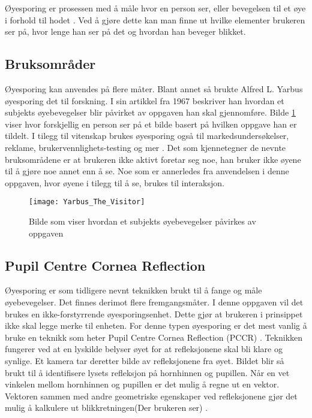 Øyesporing er prosessen med å måle hvor en person ser, eller bevegelsen til et øye i forhold til hodet \cite{Eye t4:online}. Ved å gjøre dette kan man finne ut hvilke elementer brukeren ser på, hvor lenge han ser på det og hvordan han beveger blikket. 


\subsection{Bruksområder}

Øyesporing kan anvendes på flere måter. Blant annet så brukte Alfred L. Yarbus øyesporing det til forskning. I sin artikkel fra 1967 \cite{wexle4:online} beskriver han hvordan et subjekts øyebevegelser blir påvirket av oppgaven han skal gjennomføre. Bilde \ref{fig:yarbus} viser hvor forskjellig en person ser på et bilde basert på hvilken oppgave han er tildelt. I tilegg til vitenskap brukes øyesporing også til markedsundersøkelser, reklame, brukervennlighets-testing og mer \cite{Case2:online}. Det som kjennetegner de nevnte bruksområdene er at brukeren ikke aktivt foretar seg noe, han bruker ikke øyene til å gjøre noe annet enn å se. Noe som er annerledes fra anvendelsen i denne oppgaven, hvor øyene i tilegg til å se, brukes til interaksjon.



\begin{figure}[ht!]
\centering
\texttt{[image: Yarbus\_The\_Visitor]}
\caption{Bilde som viser hvordan et subjekts øyebevegelser påvirkes av oppgaven \cite{Yarbu2:online}}
\label{fig:yarbus}
\end{figure}


\subsection{Pupil Centre Cornea Reflection}

Øyesporing er som tidligere nevnt teknikken brukt til å fange og måle øyebevegelser. Det finnes derimot flere fremgangsmåter. I denne oppgaven vil det brukes en ikke-forstyrrende øyesporingsenhet. Dette gjør at brukeren i prinsippet ikke skal legge merke til enheten. For denne typen øyesporing er det mest vanlig å bruke en teknikk som heter Pupil Centre Cornea Reflection (\gls{PCCR}) \cite{Calibration}. Teknikken fungerer ved at en lyskilde belyser øyet for at refleksjonene skal bli klare og synlige. Et kamera tar deretter bilde av refleksjonene fra øyet. Bildet blir så brukt til å identifisere lysets refleksjon på hornhinnen og pupillen. Når en vet vinkelen mellom hornhinnen og pupillen er det mulig å regne ut en vektor. Vektoren sammen med andre geometriske egenskaper ved refleksjonene gjør det mulig å kalkulere ut blikkretningen(Der brukeren ser) \cite{Calibration}.


